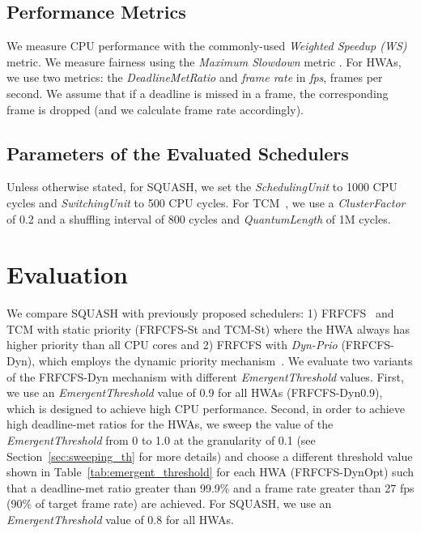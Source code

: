\documentclass[10pt,letterpaper]{article}
\newcommand{\MODIFIEDISCA}[1]{#1}
\begin{document}
\subsection{Performance Metrics} We measure CPU performance with the
commonly-used \emph{Weighted Speedup (WS)}~\cite{weighted-speedup,ws} metric. We
measure fairness using the \emph{Maximum Slowdown} metric \cite{max-slowdown,
atlas, tcm}. For HWAs, we use two metrics: the \emph{DeadlineMetRatio} and
\emph{frame rate} in \emph{fps}, frames per second. We assume that if a deadline
is missed in a frame, the corresponding frame is dropped (and we calculate frame
rate accordingly).



\subsection{Parameters of the Evaluated Schedulers}
Unless otherwise stated, for SQUASH, we set the {\it SchedulingUnit} to 1000 CPU cycles
and {\it SwitchingUnit} to 500 CPU cycles. 
For TCM~\cite{tcm}, we use a \emph{ClusterFactor} of 0.2
and a shuffling interval of 800 cycles and {\it QuantumLength} of
1M cycles.

 \section{Evaluation}\label{sec:evaluation} We compare SQUASH with previously
proposed schedulers: 1) FRFCFS~\cite{frfcfs} and TCM with static priority
(FRFCFS-St and \mbox{TCM-St}) where the HWA always has higher priority than all
CPU cores and 2) FRFCFS with \emph{Dyn-Prio} (FRFCFS-Dyn), which employs the
dynamic priority mechanism~\cite{schedulingCPUGPU}. \MODIFIEDISCA{We evaluate
two variants of the FRFCFS-Dyn mechanism with different {\it EmergentThreshold}
values. First, we use an {\it EmergentThreshold} value of 0.9 for all HWAs
(FRFCFS-Dyn0.9), which is designed to achieve high CPU performance. Second, in
order to achieve high deadline-met ratios for the HWAs, we sweep the value of
the {\it EmergentThreshold} from 0 to 1.0 at the granularity of 0.1 (see
Section~\ref{sec:sweeping_th} for more details) and choose a different threshold 
value shown in Table~\ref{tab:emergent_threshold} for each HWA (FRFCFS-DynOpt)
such that a deadline-met ratio greater than 99.9\% and a frame rate greater than
27 fps (90\% of target frame rate) are achieved.} For SQUASH, we use an {\it
EmergentThreshold} value of 0.8 for all HWAs.
\end{document}
